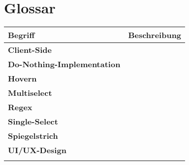 \chapter{Glossar}
\label{chap:glossary}

\begin{table}[!ht]
    \label{table:Glossary}
    \footnotesize
    \begin{threeparttable}
        \begin{tabular}{ l | l }
            \bf{Begriff} & \bf{Beschreibung} \\
            \hline \hline
            \bf{Client-Side} &  \\
            \hline
            \bf{Do-Nothing-Implementation} &  \\
            \hline
            \bf{Hovern} &  \\
            \hline
            \bf{Multiselect} &  \\
            \hline
            \bf{Regex} &  \\
            \hline
            \bf{Single-Select} &  \\
            \hline
            \bf{Spiegelstrich} &  \\
            \hline
            \bf{UI/UX-Design} &  \\
            \hline
            \bf{} &  \\
        \end{tabular}
    \end{threeparttable}
\end{table}
